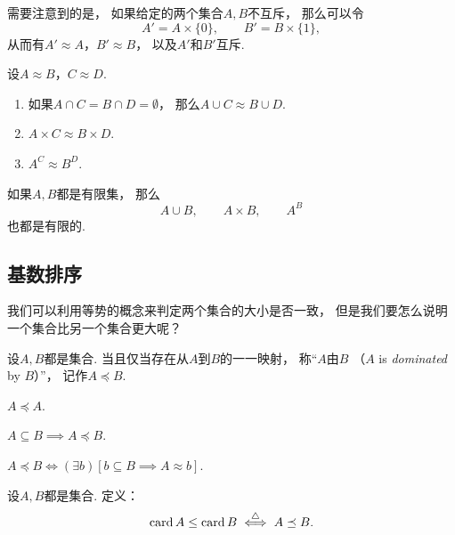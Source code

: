 需要注意到的是，
如果给定的两个集合\(A,B\)不互斥，
那么可以令\[
	A' = A\times\{0\}, \qquad
	B' = B\times\{1\},
\]
从而有\(A' \approx A\)，\(B' \approx B\)，
以及\(A'\)和\(B'\)互斥.

\begin{theorem}
设\(A \approx B\)，\(C \approx D\).
\begin{enumerate}
	\item 如果\(A \cap C = B \cap D = \emptyset\)，
	那么\(A \cup C \approx B \cup D\).
	\item \(A \times C \approx B \times D\).
	\item \(A^C \approx B^D\).
\end{enumerate}
\end{theorem}

\begin{theorem}
如果\(A,B\)都是有限集，
那么\[
	A \cup B, \qquad
	A \times B, \qquad
	A^B
\]也都是有限的.
\end{theorem}

\subsection{基数排序}
我们可以利用等势的概念来判定两个集合的大小是否一致，
但是我们要怎么说明一个集合比另一个集合更大呢？

\begin{definition}
设\(A,B\)都是集合.
当且仅当存在从\(A\)到\(B\)的一一映射，
称“\(A\)由\(B\) （\(A\) is \emph{dominated} by \(B\)）”，
记作\(A \preceq B\).
\end{definition}

\begin{example}
\(A \preceq A\).
\end{example}

\begin{example}
\(A \subseteq B \implies A \preceq B\).
\end{example}

\begin{theorem}
\(A \preceq B
\iff
(\exists b)[b \subseteq B \implies A \approx b]\).
\end{theorem}

\begin{definition}
设\(A,B\)都是集合.
定义：\begin{equation}
	\operatorname{card} A \leq \operatorname{card} B \overset{\triangle}{\iff} A \preceq B.
\end{equation}
\end{definition}

